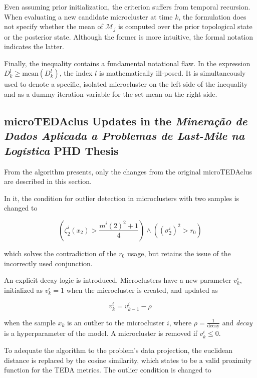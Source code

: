 \documentclass[a4paper]{article}
\begin{document}
Even assuming prior initialization, the criterion suffers from temporal recursion. When evaluating a new candidate microcluster at time $k$, the formulation does not specify whether the mean of $\mathcal{M}_j$ is computed over the prior topological state or the posterior state. Although the former is more intuitive, the formal notation indicates the latter.

Finally, the inequality contains a fundamental notational flaw. In the expression $D^l_k \ge \text{mean}\left(D^l_k\right)$, the index $l$ is mathematically ill-posed. It is simultaneously used to denote a specific, isolated microcluster on the left side of the inequality and as a dummy iteration variable for the set mean on the right side.

\subsection{microTEDAclus Updates in the \textit{Mineração de Dados Aplicada a Problemas de Last-Mile na Logística} PHD Thesis}

From the algorithm \cite{galindo2021lastmile} presents, only the changes from the original microTEDAclus are described in this section.

In it, the condition for outlier detection in microclusters with two samples is changed to

\begin{equation}
    \left( \zeta^i_2(x_2)  > \frac{m^i(2)^2+1}{4} \right) \land \left( \left( \sigma^i_2 \right)^2 > r_0 \right)
\end{equation}

which solves the contradiction of the $r_0$ usage, but retains the issue of the incorrectly used conjunction.

An explicit decay logic is introduced. Microclusters have a new parameter $v^i_k$, initialized as $v^i_k = 1$ when the microcluster is created, and updated as

\begin{equation}
    v^i_k = v^i_{k-1} - \rho
\end{equation}

when the sample $x_k$ is an outlier to the microcluster $i$, where $\rho = \frac{1}{\text{decay}}$ and \textit{decay} is a hyperparameter of the model. A microcluster is removed if $v^i_k \le 0$.

To adequate the algorithm to the problem's data projection, the euclidean distance is replaced by the cosine similarity, which \cite{angelov2014outside} states to be a valid proximity function for the TEDA metrics. The outlier condition is changed to
\end{document}
